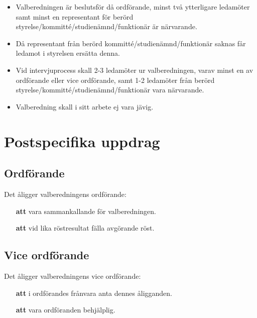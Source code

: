 \begin{itemize}

\item Valberedningen är beslutsför då ordförande, minst två ytterligare ledamöter samt minst en representant för berörd styrelse/kommitté/studienämnd/funktionär är närvarande.

\item Då representant från berörd kommitté/studienämnd/funktionär saknas får ledamot i styrelsen ersätta denna.

\item Vid intervjuprocess skall 2-3 ledamöter ur valberedningen, varav minst en av ordförande eller vice ordförande, samt 1-2 ledamöter från berörd styrelse/kommitté/studienämnd/funktionär vara närvarande.

\item Valberedning skall i sitt arbete ej vara jävig.

\end{itemize}

\section{Postspecifika uppdrag}

\subsection{Ordförande}
Det åligger valberedningens ordförande:

\begin{itemize}

\item[\textbf{att}] vara sammankallande för valberedningen.

\item[\textbf{att}] vid lika röstresultat fälla avgörande röst.

\end{itemize}

\subsection{Vice ordförande}
Det åligger valberedningens vice ordförande:

\begin{itemize}

\item[\textbf{att}] i ordförandes frånvara anta dennes åligganden.

\item[\textbf{att}] vara ordföranden behjälplig.

\end{itemize}


